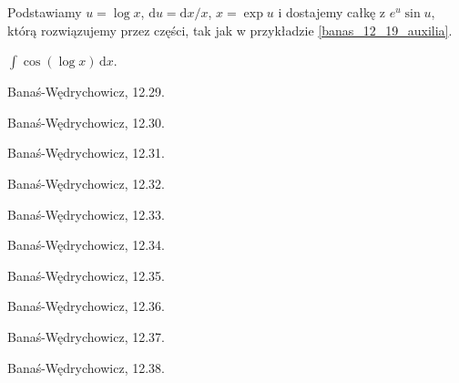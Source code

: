 \begin{solution}
    Podstawiamy $u = \log x$, $\mathrm{d} u = \mathrm{d} x / x$, $x = \exp u$ i dostajemy całkę z $e^u \sin u$, którą rozwiązujemy przez części, tak jak w przykładzie \ref{banas_12_19_auxilia}.
\end{solution}

\begin{problem_nosolution}
    \label{banas_12_20}%
    $\int \cos(\log x) \, \mathrm{d}x$.
\end{problem_nosolution}    

\begin{problem}
    Banaś-Wędrychowicz, 12.29.
\end{problem}

\begin{problem}
    Banaś-Wędrychowicz, 12.30.
\end{problem}

\begin{problem}
    Banaś-Wędrychowicz, 12.31.
\end{problem}

\begin{problem}
    Banaś-Wędrychowicz, 12.32.
\end{problem}

\begin{problem}
    Banaś-Wędrychowicz, 12.33.
\end{problem}

\begin{problem}
    Banaś-Wędrychowicz, 12.34.
\end{problem}

\begin{problem}
    Banaś-Wędrychowicz, 12.35.
\end{problem}

\begin{problem}
    Banaś-Wędrychowicz, 12.36.
\end{problem}

\begin{problem}
    Banaś-Wędrychowicz, 12.37.
\end{problem}

\begin{problem}
    Banaś-Wędrychowicz, 12.38.
\end{problem}

